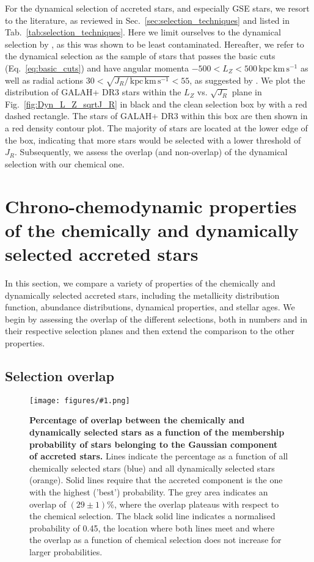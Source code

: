 \documentclass[fleqn,usenatbib]{mnras}
\newcommand{\kpckms}{\,\mathrm{kpc\,km\,s^{-1}}}	%
\newcommand{\codeicon}{{\faCloudDownload}}
\newcommand{\codelink}[1]{\href{https://github.com/svenbuder/Accreted-stars-in-GALAH-DR3/tree/main/figures/#1.ipynb}{\codeicon}\,\,}
\newcommand{\oscaption}[2]{\caption{#2 \codelink{#1}}}
\newcommand{\figurecolumnwidth}[3]{\begin{figure} \centering \texttt{[image: figures/\#1.png]}\oscaption{#2}{#3}\label{fig:#1} \end{figure}}
\begin{document}
For the dynamical selection of accreted stars, and especially GSE stars, we resort to the literature, as reviewed in Sec.~\ref{sec:selection_techniques} and listed in Tab.~\ref{tab:selection_techniques}. Here we limit ourselves to the dynamical selection by \citet{Feuillet2021}, as this was shown to be least contaminated. Hereafter, we refer to the dynamical selection as the sample of stars that passes the basic cuts (Eq.~\ref{eq:basic_cuts}) and have angular momenta $-500 < L_Z < 500 \kpckms$ as well as radial actions $30 < \sqrt{J_R / \kpckms} < 55$, as suggested by \citet{Feuillet2021}. We plot the distribution of GALAH+ DR3 stars within the $L_Z$ vs. $\sqrt{J_R}$ plane in Fig.~\ref{fig:Dyn_L_Z_sqrtJ_R} in black and the clean selection box by \citet{Feuillet2021} with a red dashed rectangle. The stars of GALAH+ DR3 within this box are then shown in a red density contour plot. The majority of stars are located at the lower edge of the box, indicating that more stars would be selected with a lower threshold of $J_R$. Subsequently, we assess the overlap (and non-overlap) of the dynamical selection with our chemical one.

\section{Chrono-chemodynamic properties of the chemically and dynamically selected accreted stars} \label{sec:chronochemodynamics}

In this section, we compare a variety of properties of the chemically and dynamically selected accreted stars, including the metallicity distribution function, abundance distributions, dynamical properties, and stellar ages. We begin by assessing the overlap of the different selections, both in numbers and in their respective selection planes and then extend the comparison to the other properties.

\subsection{Selection overlap} \label{sec:overlap_planes}

\figurecolumnwidth{quantitative_overlap_chemdyn}{chronochemodynamic_comparison}{
\textbf{Percentage of overlap between the chemically and dynamically selected stars as a function of the membership probability of stars belonging to the Gaussian component of accreted stars.} Lines indicate the percentage as a function of all chemically selected stars (blue) and all dynamically selected stars (orange). Solid lines require that the accreted component is the one with the highest ('best') probability. The grey area indicates an overlap of $(29\pm1)\%$, where the overlap plateaus with respect to the chemical selection. The black solid line indicates a normalised probability of 0.45, the location where both lines meet and where the overlap as a function of chemical selection does not increase for larger probabilities.
}
\end{document}
